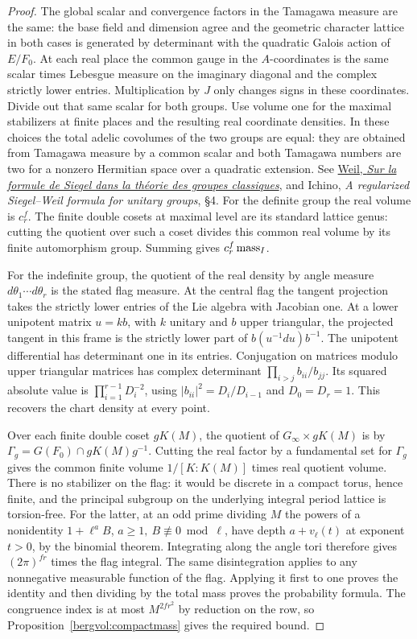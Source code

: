 \begin{proof}
The global scalar and convergence factors in the Tamagawa measure
are the same: the base field and dimension agree and the geometric
character lattice in both cases is generated by determinant with
the quadratic Galois action of \(E/F_0\). At each real place the
common gauge in the \(A\)-coordinates is the same scalar times
Lebesgue measure on the imaginary diagonal and the complex
strictly lower entries. Multiplication by \(J\) only changes signs
in these coordinates. Divide out that same scalar for both groups.
Use volume one for the maximal stabilizers at finite places and
the resulting real coordinate densities. In these choices the
total adelic covolumes of the two groups are equal: they are
obtained from Tamagawa measure by a common scalar and both
Tamagawa numbers are two for a nonzero Hermitian space over a
quadratic extension. See \href{https://doi.org/10.1007/BF02391774}
{Weil, \emph{Sur la formule de Siegel dans la th\'eorie des groupes
classiques}}, and Ichino, \emph{A regularized Siegel--Weil formula
for unitary groups}, \S4. For the definite group the real volume is
\(c_r^f\). The finite double cosets at maximal level are its
standard lattice genus: cutting the quotient over such a coset
divides this common real volume by its finite automorphism group.
Summing gives \(c_r^f\,{\rm mass}_I\).

For the indefinite group, the quotient of the real density by
angle measure \(d\theta_1\cdots d\theta_r\) is the stated flag
measure. At the central flag the tangent projection takes the
strictly lower entries of the Lie algebra with Jacobian one.
At a lower unipotent matrix \(u=k b\), with \(k\) unitary and
\(b\) upper triangular, the projected tangent in this frame is
the strictly lower part of \(b(u^{-1}du)b^{-1}\).
The unipotent differential has determinant one in its entries.
Conjugation on matrices modulo upper triangular matrices has
complex determinant \(\prod_{i>j} b_{ii}/b_{jj}\). Its squared
absolute value is \(\prod_{i=1}^{r-1}D_i^{-2}\), using
\(|b_{ii}|^2=D_i/D_{i-1}\) and \(D_0=D_r=1\).
This recovers the chart density at every point.

Over each finite double coset \(gK(M)\), the quotient of
\(G_\infty\times gK(M)\) is by
\(\Gamma_g=G(F_0)\cap gK(M)g^{-1}\). Cutting the real factor
by a fundamental set for \(\Gamma_g\) gives the common finite
volume \(1/[K:K(M)]\) times real quotient volume. There is no
stabilizer on the flag: it would be discrete in a compact torus,
hence finite, and the principal subgroup on the underlying
integral period lattice is torsion-free. For the latter, at an
odd prime dividing \(M\) the powers of a nonidentity
\(1+\ell^a B\), \(a\ge1,\ B\not\equiv0\bmod\ell\), have depth
\(a+v_\ell(t)\) at exponent \(t>0\), by the binomial theorem.
Integrating along the angle tori therefore gives \((2\pi)^{fr}\)
times the flag integral. The same disintegration applies to any
nonnegative measurable function of the flag. Applying it first
to one proves the identity and then dividing by the total mass
proves the probability formula. The congruence index is at most
\(M^{2fr^2}\) by reduction on the row, so
Proposition~\ref{bergvol:compactmass} gives the required bound.
\end{proof}

